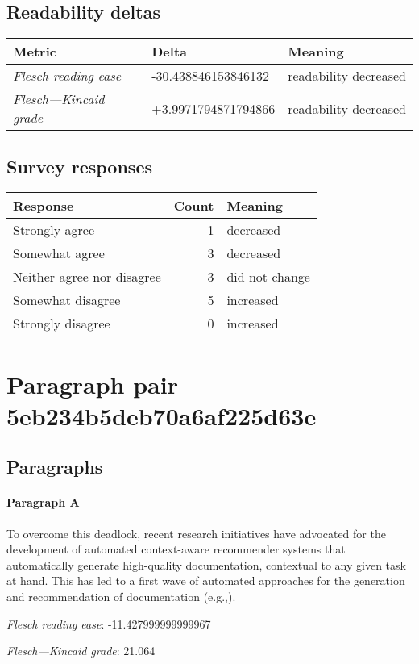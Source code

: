\subsection{Readability deltas}

\begin{tabular}{lll}
\toprule
               \textbf{Metric} &       \textbf{Delta} &       \textbf{Meaning} \\
\midrule
    \emph{Flesch reading ease} &  -30.438846153846132 &  readability decreased \\
 \emph{Flesch---Kincaid grade} &  +3.9971794871794866 &  readability decreased \\
\bottomrule
\end{tabular}

\subsection{Survey responses}
\begin{tabular}{lrl}
\toprule
          \textbf{Response} &  \textbf{Count} & \textbf{Meaning} \\
\midrule
             Strongly agree &               1 &        decreased \\
             Somewhat agree &               3 &        decreased \\
 Neither agree nor disagree &               3 &   did not change \\
          Somewhat disagree &               5 &        increased \\
          Strongly disagree &               0 &        increased \\
\bottomrule
\end{tabular}

\section{Paragraph pair 5eb234b5deb70a6af225d63e}
\subsection{Paragraphs}
\paragraph{Paragraph A}
To overcome this deadlock, recent research initiatives have advocated for the development of automated context-aware recommender systems that automatically generate high-quality documentation, contextual to any given task at hand. This has led to a first wave of automated approaches for the generation and recommendation of documentation (e.g.,).\par\medskip\emph{Flesch reading ease}: -11.427999999999967\par\emph{Flesch---Kincaid grade}: 21.064

